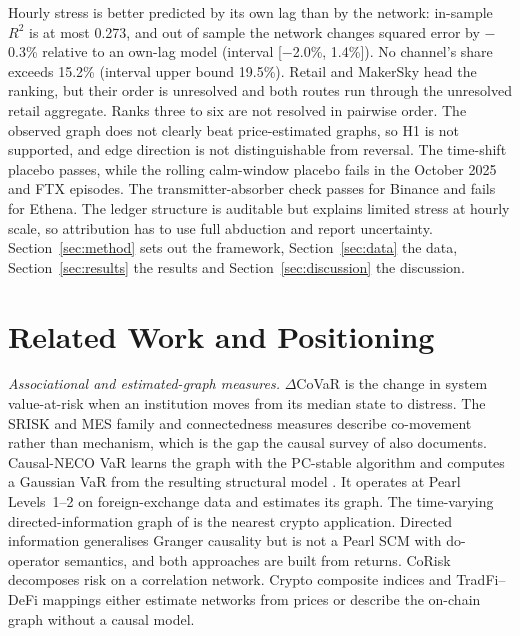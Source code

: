 \documentclass[referee,pdflatex,sn-mathphys-ay]{sn-jnl}
\theoremstyle{thmstyleone}%
\theoremstyle{thmstyletwo}%
\theoremstyle{thmstylethree}%
\begin{document}
Hourly stress is better predicted by its own lag than by the network: in-sample $R^2$ is at most
0.273, and out of sample the network changes squared error by $-$0.3\% relative to an
own-lag model (interval [$-$2.0\%, 1.4\%]). No channel's share
exceeds 15.2\% (interval upper bound 19.5\%). Retail and MakerSky head the ranking, but
their order is unresolved and both routes run through the unresolved retail aggregate. Ranks three to six
are not resolved in pairwise order. The observed graph does not clearly beat price-estimated graphs, so H1 is
not supported, and edge direction is not distinguishable from reversal. The time-shift placebo passes, while the
rolling calm-window placebo fails in the October 2025 and FTX episodes. The transmitter-absorber check passes for
Binance and fails for Ethena. The ledger structure is auditable but explains limited stress at hourly scale, so
attribution has to use full abduction and report uncertainty. Section~\ref{sec:method} sets out the framework,
Section~\ref{sec:data} the data, Section~\ref{sec:results} the results and Section~\ref{sec:discussion} the discussion.

\section{Related Work and Positioning}
\label{sec:related}

\emph{Associational and estimated-graph measures.} $\Delta$CoVaR \citep{adrian2016covar} is the change in
system value-at-risk when an institution moves from its median state to distress. The
SRISK and MES family \citep{acharya2017measuring} and connectedness measures
\citep{diebold2014network,billio2012econometric} describe co-movement rather than mechanism, which is the gap the causal
survey of \citet{kumar2025causalreview} also documents. Causal-NECO VaR \citep{rigana2024neco} learns the graph
with the PC-stable algorithm \citep{colombo2014order} and computes a Gaussian VaR from the
resulting structural model \citep{rigana2023new,spirtes2000causation}. It operates at
Pearl Levels~1--2 on foreign-exchange data and estimates its graph. The time-varying
directed-information graph of \citet{etesami2023tvdig} is the nearest crypto application. Directed information
generalises Granger causality \citep{granger1969} but is not a Pearl SCM with do-operator semantics, and both approaches are
built from returns. CoRisk \citep{giudici2018corisk} decomposes risk on a correlation network. Crypto composite
indices \citep{farzulla2026asri} and TradFi--DeFi mappings \citep{aufiero2025mapping} either estimate networks from prices or
describe the on-chain graph without a causal model.
\end{document}
